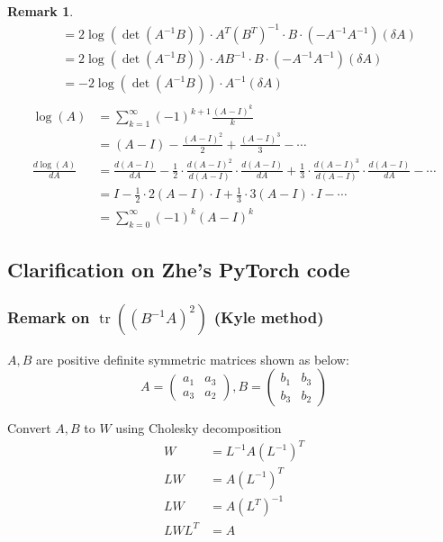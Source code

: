 \documentclass{article}
\theoremstyle{definition}
\theoremstyle{plain}
\newtheorem{remark}{Remark}
\begin{document}
\begin{remark}
\begin{align*}
    &=2\log(\det(A^{-1}B))\cdot A^T(B^T)^{-1}\cdot B\cdot(-A^{-1}A^{-1})(\delta A)\\
    &=2\log(\det(A^{-1}B))\cdot AB^{-1}\cdot B\cdot(-A^{-1}A^{-1})(\delta A)\\
    &=-2\log(\det(A^{-1}B))\cdot A^{-1}(\delta A)\\
\end{align*}
\begin{align*}
    \log(A)&=\sum^\infty_{k=1}(-1)^{k+1}\frac{(A-I)^k}{k}\\
    &=(A-I)-\frac{(A-I)^2}{2}+\frac{(A-I)^3}{3}-\cdots\\
    \frac{d\log(A)}{dA}&=\frac{d(A-I)}{dA}-\frac{1}{2}\cdot\frac{d(A-I)^2}{d(A-I)}\cdot\frac{d(A-I)}{dA}+\frac{1}{3}\cdot\frac{d(A-I)^3}{d(A-I)}\cdot\frac{d(A-I)}{dA}-\cdots\\
    &=I-\frac{1}{2}\cdot2(A-I)\cdot I+\frac{1}{3}\cdot3(A-I)\cdot I-\cdots\\
    &=\sum^\infty_{k=0}(-1)^k(A-I)^k
\end{align*}
\end{remark}

\subsection{Clarification on Zhe's PyTorch code}
\subsubsection{Remark on $\operatorname{tr}((B^{-1}A)^2)$ (Kyle method)}
$A, B$ are positive definite symmetric matrices shown as below:
\begin{equation*}
    A=
    \begin{pmatrix}
    a_1 & a_3\\
    a_3 & a_2
    \end{pmatrix},
    B=
    \begin{pmatrix}
    b_1 & b_3\\
    b_3 & b_2
    \end{pmatrix}
\end{equation*}

Convert $A, B$ to $W$ using Cholesky decomposition
\begin{align*}
    W&=L^{-1}A(L^{-1})^T\\
    LW&=A(L^{-1})^T\\
    LW&=A(L^T)^{-1}\\
    LWL^T&=A
\end{align*}
\end{document}
